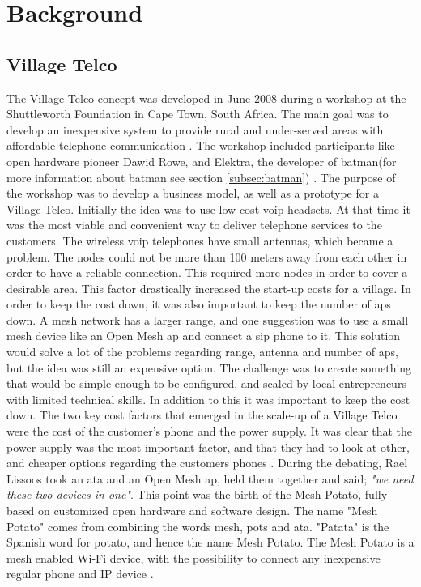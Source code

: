 \chapter{Background}
\label{chp:background} 

\section{Village Telco}
The Village Telco concept was developed in June 2008 during a workshop at the Shuttleworth Foundation in Cape Town, South Africa. The main goal was to develop an inexpensive system to provide rural and under-served areas with affordable telephone communication \cite{MParticle}. The workshop included participants like open hardware pioneer Dawid Rowe, and Elektra, the developer of \gls{batman}(for more information about \gls{batman} see section \ref{subsec:batman}) \cite{MPworkshop}. The purpose of the workshop was to develop a business model, as well as a prototype for a Village Telco. Initially the idea was to use low cost \gls{voip} headsets. At that time it was the most viable and convenient way to deliver telephone services to the customers. The wireless \gls{voip} telephones have small antennas, which became a problem. The nodes could not be more than 100 meters away from each other in order to have a reliable connection. This required more nodes in order to cover a desirable area. This factor drastically increased the start-up costs for a village. In order to keep the cost down, it was also important to keep the number of \glspl{ap} down. A mesh network has a larger range, and one suggestion was to use a small mesh device like an Open Mesh \gls{ap} and connect a \gls{sip} phone to it. This solution would solve a lot of the problems regarding range, antenna and number of \glspl{ap}, but the idea was still an expensive option. The challenge was to create something that would be simple enough to be configured, and scaled by local entrepreneurs with limited technical skills. In addition to this it was important to keep the cost down. The two key cost factors that emerged in the scale-up of a Village Telco were the cost of the customer's phone and the power supply. It was clear that the power supply was the most important factor, and that they had to look at other, and cheaper options regarding the customers phones \cite{MPworkshop}. During the debating, Rael Lissoos took an \gls{ata} and an Open Mesh \gls{ap}, held them together and said; \textit{"we need these two devices in one"}. This point was the birth of the Mesh Potato, fully based on customized open hardware and software design. The name "Mesh Potato" comes from combining the words mesh, \gls{pots} and \gls{ata}. "Patata" is the Spanish word for potato, and hence the name Mesh Potato. The Mesh Potato is a mesh enabled Wi-Fi device, with the possibility to connect any inexpensive regular phone and IP device \cite{MPorigin}.


